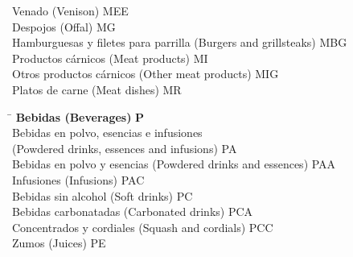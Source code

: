 \begin{small}
\begin{tabbing}
                \hspace{1cm}Venado (Venison) \> MEE \\
            \hspace{0.5cm}Despojos (Offal) \> MG \\
                \hspace{1cm}Hamburguesas y filetes para parrilla (Burgers and grillsteaks) \> MBG \\
            \hspace{0.5cm}Productos cárnicos (Meat products) \> MI \\
                \hspace{1cm}Otros productos cárnicos (Other meat products) \> MIG \\
            \hspace{0.5cm}Platos de carne (Meat dishes) \> MR \\
    \end{tabbing}

    \vspace{-1.25cm}
    
    \begin{tabbing}
    \hspace{15cm} \= \hspace{0cm} \kill
        \textbf{Bebidas (Beverages)} \> \textbf{P} \\
            \hspace{0.5cm}Bebidas en polvo, esencias e infusiones  \\
            \hspace{0.5cm}(Powdered drinks, essences and infusions) \> PA \\
                \hspace{1cm}Bebidas en polvo y esencias (Powdered drinks and essences) \> PAA \\
                \hspace{1cm}Infusiones (Infusions) \> PAC \\
            \hspace{0.5cm}Bebidas sin alcohol (Soft drinks) \> PC \\
                \hspace{1cm}Bebidas carbonatadas (Carbonated drinks) \> PCA \\
                \hspace{1cm}Concentrados y cordiales (Squash and cordials) \> PCC \\
            \hspace{0.5cm}Zumos (Juices) \> PE \\
    \end{tabbing}


\end{small}
